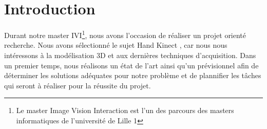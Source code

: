 \section{Introduction}

Durant notre master IVI\footnote{Le master Image Vision Interaction est 
l'un des parcours des masters informatiques de l'université de Lille 1}, 
nous avons l'occasion de réaliser un projet orienté recherche. Nous avons 
sélectionné le sujet \og Hand Kinect \fg, car nous nous intéressons à la 
modélisation 3D et aux dernières techniques d'acquisition. Dans un premier temps,
nous réalisons un état de l'art ainsi qu'un prévisionnel afin de déterminer 
les solutions adéquates pour notre problème et de plannifier les tâches qui
seront à réaliser pour la réussite du projet.

